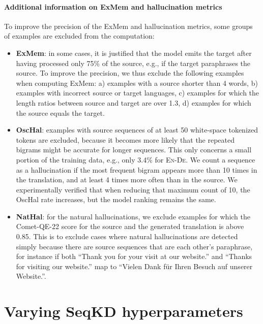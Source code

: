 \paragraph{Additional information on ExMem and hallucination metrics}
To improve the precision of the ExMem and hallucination metrics, some groups of examples are excluded from the computation:
\begin{itemize}[nosep]
\item \textbf{ExMem}: in some cases, it is justified that the model emits the target after having processed only 75\% of the source, e.g., if the target paraphrases the source. To improve the precision, we thus exclude the following examples when computing ExMem: a) examples with a source shorter than 4 words, b) examples with incorrect source or target languages, c) examples for which the length ratios between source and target are over 1.3, d) examples for which the source equals the target.
\item \textbf{OscHal}: examples with source sequences of at least 50 white-space tokenized tokens are excluded, because it becomes more likely that the repeated bigrams might be accurate for longer sequences. This only concerns a small portion of the training data, e.g., only 3.4\% for \textsc{En-De}. We count a sequence as a hallucination if the most frequent bigram appears more than 10 times in the translation, and at least 4 times more often than in the source. We experimentally verified that when reducing that maximum count of 10, the OscHal rate increases, but the model ranking remains the same.
\item \textbf{NatHal}: for the natural hallucinations, we exclude examples for which the Comet-QE-22 score for the source and the generated translation is above 0.85. This is to exclude cases where natural hallucinations are detected simply because there are source sequences that are each other's paraphrase, for instance if both ``Thank you for your visit at our website.'' and ``Thanks for visiting our website.'' map to ``Vielen Dank für Ihren Besuch auf unserer Website.''.
\end{itemize}

\vspace{-0.2cm}

\section{Varying SeqKD hyperparameters}
\label{ap:hyperparams}

